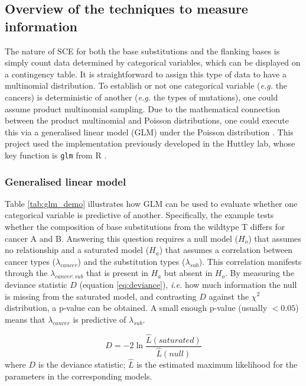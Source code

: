 \subsection{Overview of the techniques to measure information}
The nature of SCE for both the base substitutions and the flanking bases is simply count data determined by categorical variables, which can be displayed on a contingency table. It is straightforward to assign this type of data to have a multinomial distribution. To establish or not one categorical variable (\textit{e.g.} the cancers) is deterministic of another (\textit{e.g.} the types of mutations), one could assume product multinomial sampling. Due to the mathematical connection between the product multinomial and Poisson distributions, one could execute this  via a generalised linear model (GLM) under the Poisson distribution \citep{Nelder1974LOGSQUARES.}. This project used the implementation previously developed in the Huttley lab, whose key function is \texttt{glm} from R \citep{Zhu2017}.

\subsubsection{Generalised linear model}
Table \ref{tab:glm_demo} illustrates how GLM can be used to evaluate whether one categorical variable is predictive of another. Specifically, the example tests whether the composition of base substitutions from the wildtype T differs for cancer A and B. Answering this question requires a null model ($H_o$) that assumes no relationship and a saturated model ($H_a$) that assumes a correlation between cancer types ($\lambda_{cancer}$) and the substitution types ($\lambda_{sub}$). This correlation manifests through the $\lambda_{cancer:sub}$ that is present in $H_a$ but absent in $H_o$. By measuring the deviance statistic $D$ (equation \ref{eq:deviance}), \textit{i.e.} how much information the null is missing from the saturated model, and contrasting $D$ against the $\chi^2$ distribution, a p-value can be obtained. A small enough p-value (usually $<0.05$) means that $\lambda_{cancer}$ is predictive of $\lambda_{sub}$.

\begin{equation}
D = -2 \ln \frac{\hat{L}(saturated)}{\hat{L}(null)}
\label{eq:deviance}
\end{equation}
where $D$ is the deviance statistic; $\hat{L}$ is the estimated maximum likelihood for the parameters in the corresponding models.



